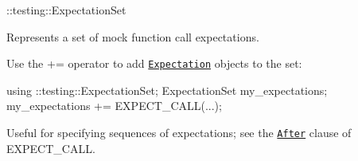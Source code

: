 {\ttfamily \+::testing\+::\+Expectation\+Set}

Represents a set of mock function call expectations.

Use the {\ttfamily +=} operator to add \href{#Expectation}{\tt {\ttfamily Expectation}} objects to the set\+:


\begin{DoxyCode}
using ::testing::ExpectationSet;
ExpectationSet my\_expectations;
my\_expectations += EXPECT\_CALL(...);
\end{DoxyCode}


Useful for specifying sequences of expectations; see the \href{#EXPECT_CALL.After}{\tt {\ttfamily After}} clause of {\ttfamily E\+X\+P\+E\+C\+T\+\_\+\+C\+A\+LL}. 